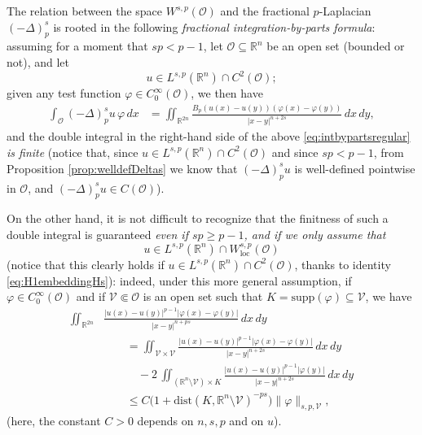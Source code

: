 \documentclass[11pt,a4paper]{amsart}
\def \R {\mathbb{R}}
\def \Oo {\mathcal{O}}
\theoremstyle{definition}
\theoremstyle{plain}
\numberwithin{equation}{section}
\begin{document}
The relation between the space $W^{s,p}(\Oo)$ and the fractional $p$-Laplacian $(-\Delta)_p^s$
is rooted in the following \emph{fractional integration-by-parts formula}:
assuming for a moment that $sp < p-1$,
let 
$\Oo\subseteq\R^n$ be an open set (bounded or not), and let
$$u\in {L}^{s,p}(\R^n)\cap C^2(\mathcal{O});$$
given any test function $\varphi\in C_0^\infty(\Oo)$, 
we then have
\begin{equation} \label{eq:intbypartsregular}
\begin{split}
 \int_{\Oo}(-\Delta)_p^su\,\varphi\,dx & = \iint_{\R^{2n}}\frac{B_p(u(x)-u(y))
  (\varphi(x)-\varphi(y))}{|x-y|^{n+2s}}\,dx\,dy,
 \end{split}
\end{equation}
and the double integral in the right-hand side of the above
\eqref{eq:intbypartsregular} \emph{is finite}
(notice that, since $u\in {L}^{s,p}(\R^n)\cap C^2(\mathcal{O})$
and since $sp < p-1$, from
Proposition \ref{prop:welldefDeltas} we 
know that $(-\Delta)_p^su$ is well-defined pointwise in $\mathcal{O}$,
and $(-\Delta)_p^su\in C(\mathcal{O})$).
\vspace*{0.1cm}

On the other hand, it is not difficult to recognize that
the finitness of such a double integral
is guaranteed \emph{even if $sp\geq p-1$, and if we only assume that}
$$u\in {L}^{s,p}(\R^n)\cap W_{\mathrm{loc}}^{s,p}(\Oo)$$
(notice that this clearly holds if $u\in {L}^{s,p}(\R^n)\cap C^2(\mathcal{O})$,
thanks to identity \eqref{eq:H1embeddingHs}):
indeed, under this more general assumption,
if $\varphi\in C_0^\infty(\Oo)$ and if $\mathcal{V}\Subset \Oo$ is an open
set such that $K = \mathrm{supp}(\varphi)\subseteq \mathcal{V}$, we have
\begin{equation} \label{eq:contDeltasu}
  \begin{split}
   \iint_{\R^{2n}}&\frac{|u(x)-u(y)|^{p-1}
 |\varphi(x)-\varphi(y)|}{|x-y|^{n+ps}}\,dx\,dy 
 \\
 &\qquad = 
 \iint_{\mathcal{V}\times\mathcal{V}}\frac{|u(x)-u(y)|^{p-1}|\varphi(x)-\varphi(y)|}{|x-y|^{n+2s}}\,dx\,dy
 \\
 &\qquad\quad-2\,\iint_{(\R^n\setminus\mathcal{V})\times K}
 \frac{|u(x)-u(y)|^{p-1}|\varphi(y)|}{|x-y|^{n+2s}}\,dx\,dy \\
 & \qquad \leq C\big(1+\mathrm{dist}(K,
 \R^n\setminus\mathcal{V})^{-ps}\big)\|\varphi\|_{s,p,\mathcal{V}},
  \end{split} 
 \end{equation}
 (here, the constant $C>0$ depends on $n,s,p$ and on $u$).
\vspace*{0.05cm}
\end{document}
